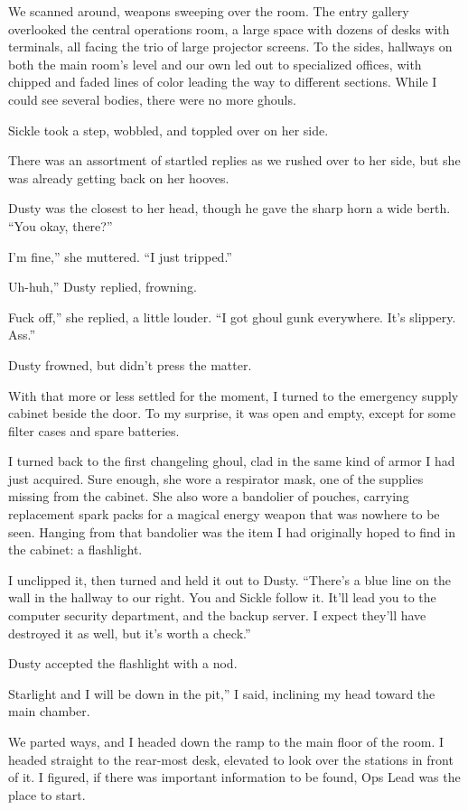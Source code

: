 We scanned around, weapons sweeping over the room. The entry gallery overlooked the central operations room, a large space with dozens of desks with terminals, all facing the trio of large projector screens. To the sides, hallways on both the main room’s level and our own led out to specialized offices, with chipped and faded lines of color leading the way to different sections. While I could see several bodies, there were no more ghouls.

Sickle took a step, wobbled, and toppled over on her side.

There was an assortment of startled replies as we rushed over to her side, but she was already getting back on her hooves.

Dusty was the closest to her head, though he gave the sharp horn a wide berth. “You okay, there?”

\leavevmode{}I’m fine,” she muttered. “I just tripped.”

\leavevmode{}Uh-huh,” Dusty replied, frowning.

\leavevmode{}Fuck off,” she replied, a little louder. “I got ghoul gunk everywhere. It’s slippery. Ass.”

Dusty frowned, but didn’t press the matter.

With that more or less settled for the moment, I turned to the emergency supply cabinet beside the door. To my surprise, it was open and empty, except for some filter cases and spare batteries.

I turned back to the first changeling ghoul, clad in the same kind of armor I had just acquired. Sure enough, she wore a respirator mask, one of the supplies missing from the cabinet. She also wore a bandolier of pouches, carrying replacement spark packs for a magical energy weapon that was nowhere to be seen. Hanging from that bandolier was the item I had originally hoped to find in the cabinet: a flashlight.

I unclipped it, then turned and held it out to Dusty. “There’s a blue line on the wall in the hallway to our right. You and Sickle follow it. It’ll lead you to the computer security department, and the backup server. I expect they’ll have destroyed it as well, but it’s worth a check.”

Dusty accepted the flashlight with a nod.

\leavevmode{}Starlight and I will be down in the pit,” I said, inclining my head toward the main chamber.

We parted ways, and I headed down the ramp to the main floor of the room. I headed straight to the rear-most desk, elevated to look over the stations in front of it. I figured, if there was important information to be found, Ops Lead was the place to start.

